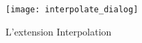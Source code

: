 \begin{figure}[ht]
   \begin{center}
   \caption{L'extension Interpolation \nixcaption}\label{fig:interpolation_dialog}\smallskip
   \texttt{[image: interpolate\_dialog]}
\end{center}  
\end{figure}

\label{interpolation_usage}

